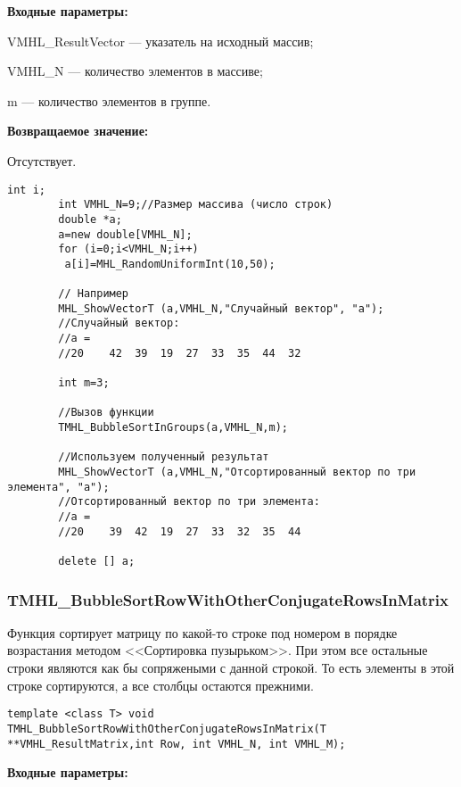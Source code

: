 \documentclass[a4paper,12pt]{article}
\begin{document}
\textbf{Входные параметры:}
 
VMHL\_ResultVector --- указатель на исходный массив;
 
VMHL\_N --- количество элементов в массиве;
 
m --- количество элементов в группе.

\textbf{Возвращаемое значение:}

Отсутствует.


\begin{lstlisting}[label=code_use_TMHL_BubbleSortInGroups,caption=Пример использования]
        int i;
        int VMHL_N=9;//Размер массива (число строк)
        double *a;
        a=new double[VMHL_N];
        for (i=0;i<VMHL_N;i++)
         a[i]=MHL_RandomUniformInt(10,50);

        // Например
        MHL_ShowVectorT (a,VMHL_N,"Случайный вектор", "a");
        //Случайный вектор:
        //a =
        //20	42	39	19	27	33	35	44	32

        int m=3;

        //Вызов функции
        TMHL_BubbleSortInGroups(a,VMHL_N,m);

        //Используем полученный результат
        MHL_ShowVectorT (a,VMHL_N,"Отсортированный вектор по три элемента", "a");
        //Отсортированный вектор по три элемента:
        //a =
        //20	39	42	19	27	33	32	35	44

        delete [] a;
\end{lstlisting}

\subsubsection{TMHL\_BubbleSortRowWithOtherConjugateRowsInMatrix}\label{TMHL_BubbleSortRowWithOtherConjugateRowsInMatrix}

Функция сортирует матрицу по какой-то строке под номером в порядке возрастания методом <<Сортировка пузырьком>>. При этом все остальные строки являются как бы сопряжеными с данной строкой. То есть элементы в этой строке сортируются, а все столбцы остаются прежними.


\begin{lstlisting}[label=code_syntax_TMHL_BubbleSortRowWithOtherConjugateRowsInMatrix,caption=Синтаксис]
template <class T> void TMHL_BubbleSortRowWithOtherConjugateRowsInMatrix(T **VMHL_ResultMatrix,int Row, int VMHL_N, int VMHL_M);
\end{lstlisting}

\textbf{Входные параметры:}
 
\end{document}
